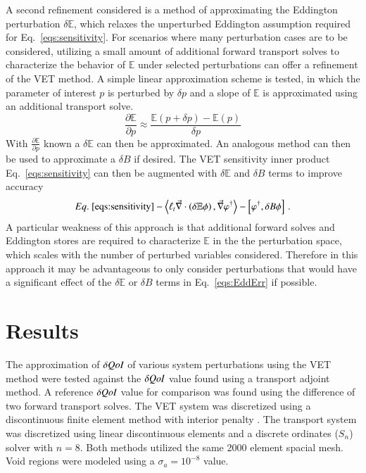 \documentclass{anstrans}
\newcommand{\bra}{\left\langle}
\newcommand{\ket}{\right\rangle}
\newcommand{\sbra}{\left[}
\newcommand{\sket}{\right]}
\renewcommand{\div}{\vec{\nabla} \cdot}
\newcommand{\grad}{\vec{\nabla}}
\newcommand{\vefadj}{\varphi^\dag}
\newcommand{\Edd}{\mathbb{E}}
\newcommand{\BEdd}{B}
\newcommand{\siga}{\sigma_a}
\newcommand{\isigt}{\ell_t}
\newcommand{\qoi}{{\it QoI}\xspace}
\begin{document}
A second refinement considered is a method of approximating the Eddington perturbation $\delta \Edd$, which relaxes the unperturbed Eddington assumption required for Eq.~\eqref{eqs:sensitivity}. For scenarios where many perturbation cases are to be considered, utilizing a small amount of additional forward transport solves to characterize the behavior of $\Edd$ under selected perturbations can offer a refinement of the VET method. A simple linear approximation scheme is tested, in which the parameter of interest $p$ is perturbed by $\delta p$ and a slope of $\Edd$ is approximated using an additional transport solve. 
\begin{equation}
\label{Eddapprox}
\frac{\partial \Edd}{\partial p} \approx \frac{\Edd(p+\delta p) - \Edd(p)}{\delta p}
\end{equation}
With $\frac{\partial \Edd}{\partial p}$ known a $\delta \Edd$ can then be approximated. An analogous method can then be used to approximate a $\delta \BEdd$ if desired. The VET sensitivity inner product Eq.~\eqref{eqs:sensitivity} can then be augmented with $\delta \Edd$ and $\delta \BEdd$ terms to improve accuracy
\begin{equation}
\label{eqs:EddErr}
 Eq.~\eqref{eqs:sensitivity}- \bra  \isigt \div \left( \delta \Edd \phi \right), \grad \vefadj \ket
- \sbra \vefadj, \delta \BEdd \phi \sket \,.
\end{equation} 
A particular weakness of this approach is that additional forward solves and Eddington stores are required to characterize $\Edd$ in the the perturbation space, which scales with the number of perturbed variables considered. Therefore in this approach it may be advantageous to only consider perturbations that would have a significant effect of the $\delta \Edd$ or $\delta \BEdd$ terms in Eq.~\eqref{eqs:EddErr} if possible. 



\section{Results}
The approximation of $\delta \qoi$ of various system perturbations using the VET method were tested against the $\delta \qoi$ value found using a transport adjoint method. A reference $\delta \qoi$ value for comparison was found using the difference of two forward transport solves. The VET system was discretized using a discontinuous finite element method with interior penalty \cite{Arnold}. The transport system was discretized using linear discontinuous elements and a discrete ordinates ($S_n$) solver with $n=8$. Both methods utilized the same 2000 element spacial mesh. Void regions were modeled using a $\siga=10^{-8}$ value.
\end{document}
